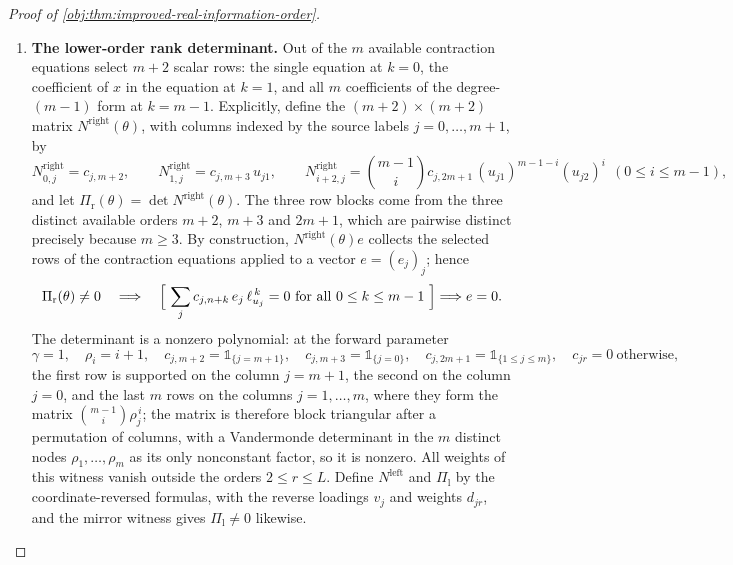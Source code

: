 \begin{proof}[Proof of \cref{obj:thm:improved-real-information-order}]
\begin{enumerate}
\item \textbf{The lower-order rank determinant.}  Out of the \(m\) available contraction equations select \(m+2\) scalar rows: the single equation at \(k=0\), the coefficient of \(x\) in the equation at \(k=1\), and all \(m\) coefficients of the degree-\((m-1)\) form at \(k=m-1\).  Explicitly, define the \((m+2)\times(m+2)\) matrix \(N^{\mathrm{right}}(\theta)\), with columns indexed by the source labels \(j=0,\ldots,m+1\), by
\[
N^{\mathrm{right}}_{0,j}=c_{j,m+2},
\qquad
N^{\mathrm{right}}_{1,j}=c_{j,m+3}\,u_{j1},
\qquad
N^{\mathrm{right}}_{i+2,j}=\binom{m-1}{i}c_{j,2m+1}\,(u_{j1})^{m-1-i}(u_{j2})^{i}
\ \ (0\le i\le m-1),
\]
and let \(\Pi_{\mathrm r}(\theta)=\det N^{\mathrm{right}}(\theta)\).  The three row blocks come from the three distinct available orders \(m+2\), \(m+3\) and \(2m+1\), which are pairwise distinct precisely because \(m\ge3\).  By construction, \(N^{\mathrm{right}}(\theta)e\) collects the selected rows of the contraction equations applied to a vector \(e=(e_j)_j\); hence
\[
\Pi_{\mathrm r}(\theta)\ne0
\quad\Longrightarrow\quad
\Bigl[\ \sum_{j}c_{j,n+k}\,e_j\,\ell_{u_j}^{\,k}=0\ \text{for all }0\le k\le m-1\ \Bigr]\Longrightarrow e=0 .
\]
The determinant is a nonzero polynomial: at the forward parameter
\[
\gamma=1,\quad \rho_i=i+1,\quad
c_{j,m+2}=\mathbb 1_{\{j=m+1\}},\quad
c_{j,m+3}=\mathbb 1_{\{j=0\}},\quad
c_{j,2m+1}=\mathbb 1_{\{1\le j\le m\}},\quad c_{jr}=0\ \text{otherwise},
\]
the first row is supported on the column \(j=m+1\), the second on the column \(j=0\), and the last \(m\) rows on the columns \(j=1,\ldots,m\), where they form the matrix \(\binom{m-1}{i}\rho_j^{\,i}\); the matrix is therefore block triangular after a permutation of columns, with a Vandermonde determinant in the \(m\) distinct nodes \(\rho_1,\ldots,\rho_m\) as its only nonconstant factor, so it is nonzero.  All weights of this witness vanish outside the orders \(2\le r\le L\).  Define \(N^{\mathrm{left}}\) and \(\Pi_{\mathrm l}\) by the coordinate-reversed formulas, with the reverse loadings \(v_j\) and weights \(d_{jr}\), and the mirror witness gives \(\Pi_{\mathrm l}\ne0\) likewise.


\end{enumerate}
\end{proof}

